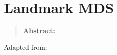 \newpage{\thispagestyle{empty}\cleardoublepage}
\chapter{Landmark MDS} 
\label{chap:lmds}

\begin{quote}
	\textbf{Abstract:} 
\end{quote}

\vfill

Adapted from:\\

\newpage

\blindtext
